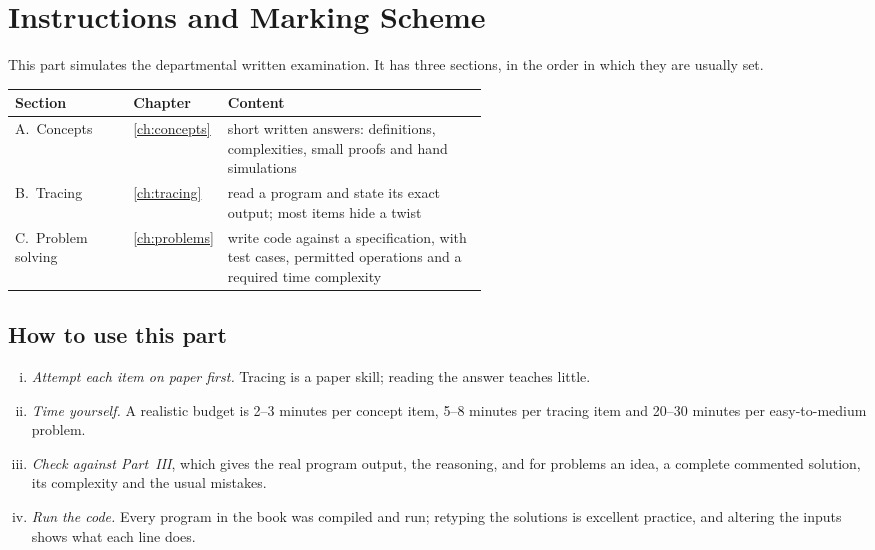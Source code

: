 \chapter{Instructions and Marking Scheme}\label{ch:instructions}

This part simulates the departmental written examination. It has three sections, in the
order in which they are usually set.

\begin{table}[ht]\centering\small
\begin{tabular}{@{}llp{0.55\linewidth}@{}}\toprule
Section & Chapter & Content\\\midrule
A.\ Concepts & \ref{ch:concepts} & short written answers: definitions, complexities, small
  proofs and hand simulations\\
B.\ Tracing & \ref{ch:tracing} & read a program and state its exact output; most items
  hide a twist\\
C.\ Problem solving & \ref{ch:problems} & write code against a specification, with test
  cases, permitted operations and a required time complexity\\\bottomrule
\end{tabular}
\end{table}

\section{How to use this part}
\begin{enumerate}[(i)]
\item \emph{Attempt each item on paper first.} Tracing is a paper skill; reading the
  answer teaches little.
\item \emph{Time yourself.} A realistic budget is 2--3 minutes per concept item, 5--8
  minutes per tracing item and 20--30 minutes per easy-to-medium problem.
\item \emph{Check against Part~III}, which gives the real program output, the reasoning,
  and for problems an idea, a complete commented solution, its complexity and the usual
  mistakes.
\item \emph{Run the code.} Every program in the book was compiled and run; retyping the
  solutions is excellent practice, and altering the inputs shows what each line does.
\end{enumerate}

